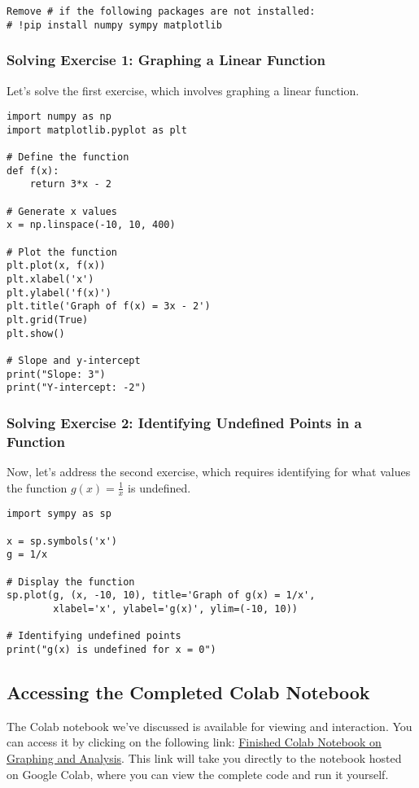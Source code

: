 \documentclass[a4paper,12pt]{book}
\begin{document}
\begin{verbatim}
Remove # if the following packages are not installed:
# !pip install numpy sympy matplotlib
\end{verbatim}

\subsubsection*{Solving Exercise 1: Graphing a Linear Function}
Let's solve the first exercise, which involves graphing a linear function.

\begin{verbatim}
import numpy as np
import matplotlib.pyplot as plt

# Define the function
def f(x):
    return 3*x - 2

# Generate x values
x = np.linspace(-10, 10, 400)

# Plot the function
plt.plot(x, f(x))
plt.xlabel('x')
plt.ylabel('f(x)')
plt.title('Graph of f(x) = 3x - 2')
plt.grid(True)
plt.show()

# Slope and y-intercept
print("Slope: 3")
print("Y-intercept: -2")
\end{verbatim}

\subsubsection*{Solving Exercise 2: Identifying Undefined Points in a Function}
Now, let's address the second exercise, which requires identifying for what values the function \( g(x) = \frac{1}{x} \) is undefined.

\begin{verbatim}
import sympy as sp

x = sp.symbols('x')
g = 1/x

# Display the function
sp.plot(g, (x, -10, 10), title='Graph of g(x) = 1/x',
        xlabel='x', ylabel='g(x)', ylim=(-10, 10))

# Identifying undefined points
print("g(x) is undefined for x = 0")
\end{verbatim}

\subsection*{Accessing the Completed Colab Notebook}

The Colab notebook we've discussed is available for viewing and interaction. You can access it by clicking on the following link: \href{https://colab.research.google.com/drive/1HF-cmwqfIZ803i1i-CFyR7ssWsDt7WvV}{Finished Colab Notebook on Graphing and Analysis}. This link will take you directly to the notebook hosted on Google Colab, where you can view the complete code and run it yourself.
\end{document}
